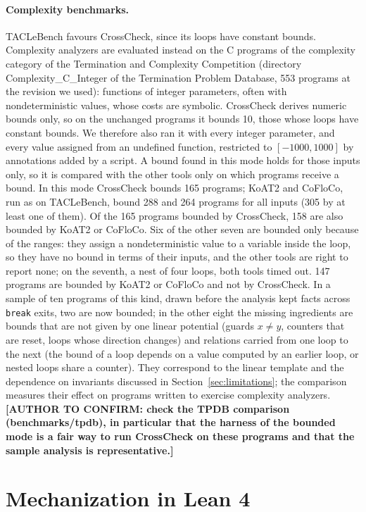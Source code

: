 \documentclass[oneside,english]{amsart}
\numberwithin{equation}{section}
\numberwithin{figure}{section}
\theoremstyle{plain}
\theoremstyle{definition}
\theoremstyle{plain}
\theoremstyle{remark}
\theoremstyle{plain}
\theoremstyle{definition}
\theoremstyle{plain}
\theoremstyle{remark}
\newcommand{\lean}[1]{{\ttfamily\small #1}}
\newcommand{\authortodo}[1]{\textbf{[AUTHOR TO CONFIRM: #1]}}
\begin{document}
\paragraph{Complexity benchmarks.}
TACLeBench favours CrossCheck, since its loops have constant bounds. Complexity analyzers are evaluated instead on the C programs of the complexity category of the Termination and Complexity Competition \cite{giesl2019termcomp} (directory \lean{Complexity\_C\_Integer} of the Termination Problem Database, 553 programs at the revision we used): functions of integer parameters, often with nondeterministic values, whose costs are symbolic. CrossCheck derives numeric bounds only, so on the unchanged programs it bounds 10, those whose loops have constant bounds. We therefore also ran it with every integer parameter, and every value assigned from an undefined function, restricted to $[-1000, 1000]$ by annotations added by a script. A bound found in this mode holds for those inputs only, so it is compared with the other tools only on which programs receive a bound. In this mode CrossCheck bounds 165 programs; KoAT2 and CoFloCo, run as on TACLeBench, bound 288 and 264 programs for all inputs (305 by at least one of them). Of the 165 programs bounded by CrossCheck, 158 are also bounded by KoAT2 or CoFloCo. Six of the other seven are bounded only because of the ranges: they assign a nondeterministic value to a variable inside the loop, so they have no bound in terms of their inputs, and the other tools are right to report none; on the seventh, a nest of four loops, both tools timed out. 147 programs are bounded by KoAT2 or CoFloCo and not by CrossCheck. In a sample of ten programs of this kind, drawn before the analysis kept facts across \texttt{break} exits, two are now bounded; in the other eight the missing ingredients are bounds that are not given by one linear potential (guards $x \ne y$, counters that are reset, loops whose direction changes) and relations carried from one loop to the next (the bound of a loop depends on a value computed by an earlier loop, or nested loops share a counter). They correspond to the linear template and the dependence on invariants discussed in Section~\ref{sec:limitations}; the comparison measures their effect on programs written to exercise complexity analyzers. \authortodo{check the TPDB comparison (benchmarks/tpdb), in particular that the harness of the bounded mode is a fair way to run CrossCheck on these programs and that the sample analysis is representative.}

\section{Mechanization in Lean 4}
\label{sec:mechanization}
\end{document}
